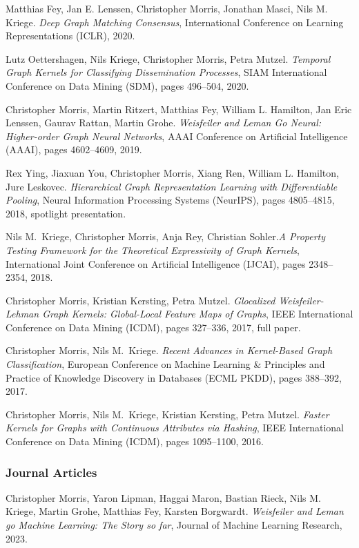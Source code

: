 \documentclass[10pt, a4paper, DIV=14, headings=small]{scrartcl}
\begin{document}
\begin{thebibliography}{15}
	Matthias Fey, Jan E. Lenssen, Christopher Morris, Jonathan Masci, Nils M. Kriege.
	\emph{Deep Graph Matching Consensus},
	International Conference on Learning Representations (ICLR), 2020.

	Lutz Oettershagen, Nils Kriege, Christopher Morris, Petra Mutzel.
	\emph{Temporal Graph Kernels for Classifying Dissemination Processes},
	SIAM International Conference on Data Mining (SDM), pages 496--504, 2020.

	Christopher Morris, Martin Ritzert, Matthias Fey, William L. Hamilton, Jan Eric Lenssen, Gaurav Rattan, Martin Grohe.
	\newblock \emph{Weisfeiler and Leman Go Neural: Higher-order Graph Neural Networks},
	\newblock AAAI Conference on Artificial Intelligence (AAAI), pages 4602--4609, 2019.

	Rex Ying, Jiaxuan You, Christopher Morris, Xiang Ren, William L. Hamilton, Jure Leskovec.
	\emph{Hierarchical Graph Representation Learning with Differentiable Pooling},
	Neural Information Processing Systems (NeurIPS), pages 4805--4815, 2018, spotlight presentation.

	Nils M.~Kriege, Christopher Morris, Anja Rey, Christian Sohler.\footnotemark[2]
	\emph{A Property Testing Framework for the Theoretical Expressivity of Graph Kernels},
	International Joint Conference on Artificial Intelligence (IJCAI), pages 2348--2354, 2018.

	Christopher Morris, Kristian Kersting, Petra Mutzel.
	\emph{Glocalized Weisfeiler-Lehman Graph Kernels: Global-Local Feature Maps of Graphs},
	IEEE International Conference on Data Mining (ICDM), pages 327--336, 2017, full paper.

	Christopher Morris, Nils M.~Kriege.
	\emph{Recent Advances in Kernel-Based Graph Classification},
	European Conference on Machine Learning \& Principles and Practice of Knowledge Discovery in Databases (ECML PKDD), pages 388--392, 2017.

	Christopher Morris, Nils M.~Kriege, Kristian Kersting, Petra Mutzel.
	\emph{Faster Kernels for Graphs with Continuous Attributes via Hashing},
	IEEE International Conference on Data Mining (ICDM), pages 1095--1100, 2016.
	\subsubsection*{Journal Articles}
	Christopher Morris, Yaron Lipman, Haggai Maron, Bastian Rieck, Nils M. Kriege, Martin Grohe, Matthias Fey, Karsten Borgwardt.
	\emph{Weisfeiler and Leman go Machine Learning: The Story so far}, Journal of Machine Learning Research, 2023.


\end{thebibliography}
\end{document}
